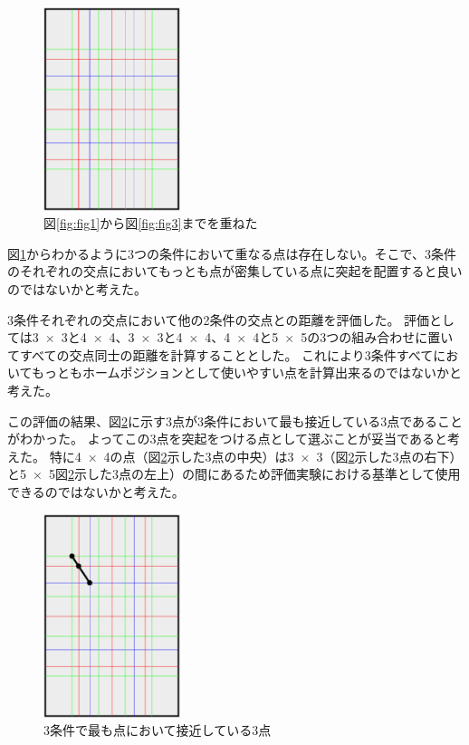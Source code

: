 \documentclass[11pt,a4paper]{jarticle}
\begin{document}
\begin{figure}[H]
  \begin{center}
  \includegraphics[width=4cm]{fig/photo4.eps}
  \caption{図\ref{fig:fig1}から図\ref{fig:fig3}までを重ねた}
  \label{fig:fig4}
  \end{center}
\end{figure}

図\ref{fig:fig4}からわかるように3つの条件において重なる点は存在しない。そこで、3条件のそれぞれの交点においてもっとも点が密集している点に突起を配置すると良いのではないかと考えた。

3条件それぞれの交点において他の2条件の交点との距離を評価した。
評価としては3~$\times$~3と4~$\times$~4、3~$\times$~3と4~$\times$~4、4~$\times$~4と5~$\times$~5の3つの組み合わせに置いてすべての交点同士の距離を計算することとした。
これにより3条件すべてにおいてもっともホームポジションとして使いやすい点を計算出来るのではないかと考えた。

この評価の結果、図\ref{fig:fig5}に示す3点が3条件において最も接近している3点であることがわかった。
よってこの3点を突起をつける点として選ぶことが妥当であると考えた。
特に4~$\times$~4の点（図\ref{fig:fig5}示した3点の中央）は3~$\times$~3（図\ref{fig:fig5}示した3点の右下）と5~$\times$~5図\ref{fig:fig5}示した3点の左上）の間にあるため評価実験における基準として使用できるのではないかと考えた。

\begin{figure}[H]
  \begin{center}
  \includegraphics[width=4cm]{fig/photo5.eps}
  \caption{3条件で最も点において接近している3点}
  \label{fig:fig5}
  \end{center}
\end{figure}
\end{document}

